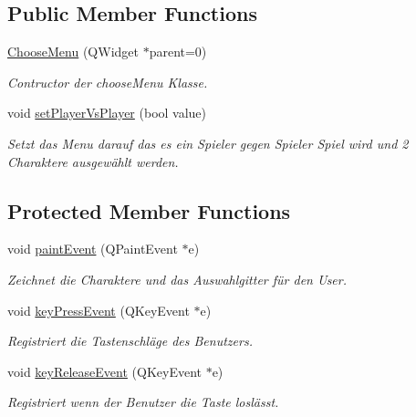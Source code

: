 \subsection*{Public Member Functions}
\begin{DoxyCompactItemize}
\item 
\hyperlink{class_choose_menu_ad44e7c05565bcea6c75ba6ddde2f0c51}{Choose\+Menu} (Q\+Widget $\ast$parent=0)
\begin{DoxyCompactList}\small\item\em Contructor der choose\+Menu Klasse. \end{DoxyCompactList}\item 
void \hyperlink{class_choose_menu_aa87f53c54f73ff60e7b4b3e77b2fa4b2}{set\+Player\+Vs\+Player} (bool value)
\begin{DoxyCompactList}\small\item\em Setzt das Menu darauf das es ein Spieler gegen Spieler Spiel wird und 2 Charaktere ausgewählt werden. \end{DoxyCompactList}\end{DoxyCompactItemize}
\subsection*{Protected Member Functions}
\begin{DoxyCompactItemize}
\item 
void \hyperlink{class_choose_menu_a98996879611931da4a621b752ecdf4d1}{paint\+Event} (Q\+Paint\+Event $\ast$e)
\begin{DoxyCompactList}\small\item\em Zeichnet die Charaktere und das Auswahlgitter für den User. \end{DoxyCompactList}\item 
void \hyperlink{class_choose_menu_ae3fec13ab674dc4a7b012efcc2b9c4f6}{key\+Press\+Event} (Q\+Key\+Event $\ast$e)
\begin{DoxyCompactList}\small\item\em Registriert die Tastenschläge des Benutzers. \end{DoxyCompactList}\item 
void \hyperlink{class_choose_menu_a89be0220a1eeb013ddc50ba27d4fa808}{key\+Release\+Event} (Q\+Key\+Event $\ast$e)
\begin{DoxyCompactList}\small\item\em Registriert wenn der Benutzer die Taste loslässt. \end{DoxyCompactList}\end{DoxyCompactItemize}


